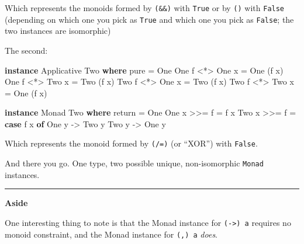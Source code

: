 \documentclass[]{article}
\newenvironment{Shaded}{}{}
\newcommand{\DataTypeTok}[1]{\textcolor[rgb]{0.56,0.13,0.00}{#1}}
\newcommand{\FunctionTok}[1]{\textcolor[rgb]{0.02,0.16,0.49}{#1}}
\newcommand{\KeywordTok}[1]{\textcolor[rgb]{0.00,0.44,0.13}{\textbf{#1}}}
\newcommand{\NormalTok}[1]{#1}
\newcommand{\OtherTok}[1]{\textcolor[rgb]{0.00,0.44,0.13}{#1}}
\begin{document}
Which represents the monoids formed by \texttt{(\&\&)} with \texttt{True} or by
\texttt{(\textbar{}\textbar{})} with \texttt{False} (depending on which one you
pick as \texttt{True} and which one you pick as \texttt{False}; the two
instances are isomorphic)

The second:

\begin{Shaded}
\begin{Highlighting}[]
\KeywordTok{instance} \DataTypeTok{Applicative} \DataTypeTok{Two} \KeywordTok{where}
\NormalTok{    pure }\FunctionTok{=} \DataTypeTok{One}
    \DataTypeTok{One}\NormalTok{ f }\FunctionTok{<*>} \DataTypeTok{One}\NormalTok{ x }\FunctionTok{=} \DataTypeTok{One}\NormalTok{ (f x)}
    \DataTypeTok{One}\NormalTok{ f }\FunctionTok{<*>} \DataTypeTok{Two}\NormalTok{ x }\FunctionTok{=} \DataTypeTok{Two}\NormalTok{ (f x)}
    \DataTypeTok{Two}\NormalTok{ f }\FunctionTok{<*>} \DataTypeTok{One}\NormalTok{ x }\FunctionTok{=} \DataTypeTok{Two}\NormalTok{ (f x)}
    \DataTypeTok{Two}\NormalTok{ f }\FunctionTok{<*>} \DataTypeTok{Two}\NormalTok{ x }\FunctionTok{=} \DataTypeTok{One}\NormalTok{ (f x)}

\KeywordTok{instance} \DataTypeTok{Monad} \DataTypeTok{Two} \KeywordTok{where}
\NormalTok{    return }\FunctionTok{=} \DataTypeTok{One}
    \DataTypeTok{One}\NormalTok{ x }\FunctionTok{>>=}\NormalTok{ f }\FunctionTok{=}\NormalTok{ f x}
    \DataTypeTok{Two}\NormalTok{ x }\FunctionTok{>>=}\NormalTok{ f }\FunctionTok{=} \KeywordTok{case}\NormalTok{ f x }\KeywordTok{of}
                    \DataTypeTok{One}\NormalTok{ y }\OtherTok{->} \DataTypeTok{Two}\NormalTok{ y}
                    \DataTypeTok{Two}\NormalTok{ y }\OtherTok{->} \DataTypeTok{One}\NormalTok{ y}
\end{Highlighting}
\end{Shaded}

Which represents the monoid formed by \texttt{(/=)} (or ``XOR'') with
\texttt{False}.

And there you go. One type, two possible unique, non-isomorphic \texttt{Monad}
instances.

\begin{center}\rule{0.5\linewidth}{\linethickness}\end{center}

\textbf{Aside}

One interesting thing to note is that the Monad instance for
\texttt{(-\textgreater{})\ a} requires no monoid constraint, and the Monad
instance for \texttt{(,)\ a} \emph{does}.
\end{document}
